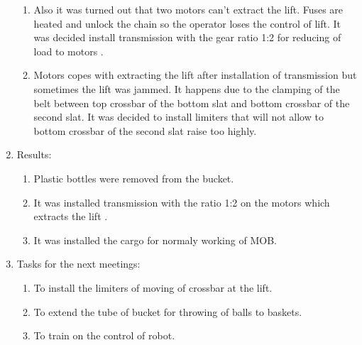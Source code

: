 \begin{enumerate}
\begin{enumerate}
      \item Also it was turned out that two motors can't extract the lift. Fuses are heated and unlock the chain so the operator loses the control of lift. It was decided install transmission with the gear ratio 1:2 for reducing of load to motors .
      
      
      \item Motors copes with extracting the lift after installation of transmission but sometimes the lift was jammed. It happens due to the clamping of the belt between top crossbar of the bottom slat and bottom crossbar of the second slat. It was decided to install limiters that will not allow to bottom crossbar of the second slat raise too highly.
          
    \end{enumerate}
    
	\item Results:
	\begin{enumerate}
	  \item Plastic bottles were removed from the bucket. 
	  
      \item It was installed transmission with the ratio 1:2 on the motors which extracts the lift .
      
      \item It was installed the cargo for normaly working of MOB.
    \end{enumerate}
    
	\item Tasks for the next meetings:
	\begin{enumerate}
	  \item To install the limiters of moving of crossbar at the lift.
	  
	  \item To extend the tube of bucket for throwing of balls to baskets.
	  
	  \item To train on the control of robot.

    \end{enumerate}     
\end{enumerate}
\fillpage